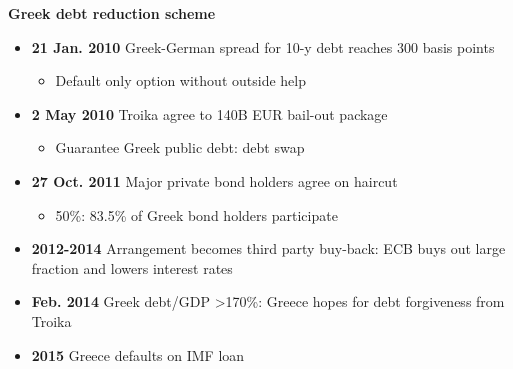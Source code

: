 \documentclass{beamer}
\begin{document}
\begin{frame}
  \textbf{Greek debt reduction scheme}
  \begin{itemize}
    \item \textbf{21 Jan. 2010} Greek-German spread for 10-y debt reaches 300 basis points
    \begin{itemize}
      \item Default only option without outside help
    \end{itemize}
    \item \textbf{2 May 2010} Troika agree to 140B EUR bail-out package
    \begin{itemize}
      \item Guarantee Greek public debt: debt swap
    \end{itemize}
    \item \textbf{27 Oct. 2011} Major private bond holders agree on haircut
    \begin{itemize}
      \item 50\%: 83.5\% of Greek bond holders participate
    \end{itemize}
    \item \textbf{2012-2014} Arrangement becomes third party buy-back: ECB buys out large fraction and lowers interest rates
  	\item \textbf{Feb. 2014} Greek debt/GDP >170\%: Greece hopes for debt forgiveness from Troika
  	\item \textbf{2015} Greece defaults on IMF loan
  \end{itemize}
\end{frame}
\end{document}
